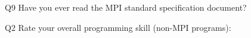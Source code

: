 \begin{description}%
\item{Q9} Have you ever read the MPI standard specification document?%
\item{Q2} Rate your overall programming skill (non-MPI programs):%
\end{description}%
